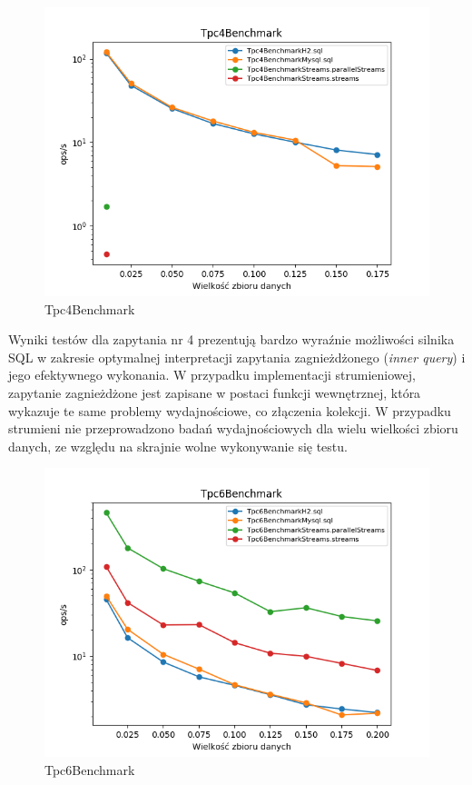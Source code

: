 \documentclass[12pt,twoside,openright]{extarticle}
\begin{document}
\newpage
\begin{figure}[H]
\centering
\includegraphics[width=15cm]{plots/Tpc4Benchmark}
\caption{Tpc4Benchmark}
\end{figure}

    Wyniki testów dla zapytania nr 4 prezentują bardzo wyraźnie możliwości silnika SQL w zakresie optymalnej interpretacji zapytania zagnieżdżonego (\textit{inner query}) i jego efektywnego wykonania. W przypadku implementacji strumieniowej, zapytanie zagnieżdżone jest zapisane w postaci funkcji wewnętrznej, która wykazuje te same problemy wydajnościowe, co złączenia kolekcji. W przypadku strumieni nie przeprowadzono badań wydajnościowych dla wielu wielkości zbioru danych, ze względu na skrajnie wolne wykonywanie się testu.

\newpage
\begin{figure}[H]
\centering
\includegraphics[width=15cm]{plots/Tpc6Benchmark}
\caption{Tpc6Benchmark}
\end{figure}
\end{document}

